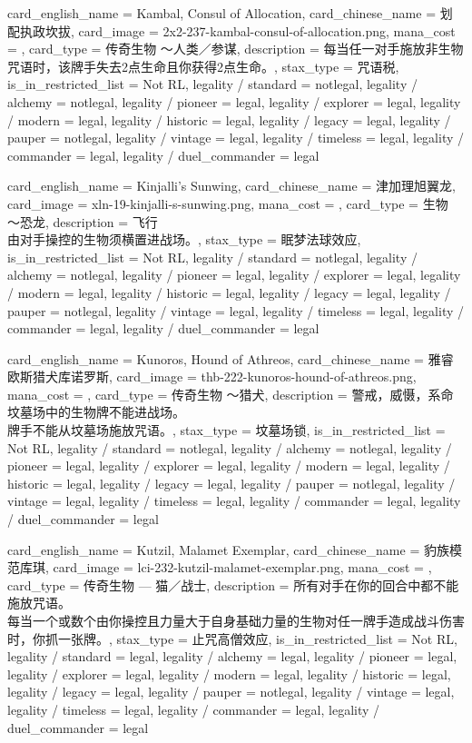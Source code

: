 \documentclass[lang = cn, color = black, 10pt]{AllThatStax}
\begin{document}
\card
{
	card_english_name = {Kambal, Consul of Allocation},
	card_chinese_name = {划配执政坎拔},
	card_image = 2x2-237-kambal-consul-of-allocation.png,
	mana_cost = ,
	card_type = 传奇生物 ～人类／参谋,
	description = {每当任一对手施放非生物咒语时，该牌手失去2点生命且你获得2点生命。},
	stax_type = 咒语税,
	is_in_restricted_list = Not RL,
	legality / standard = notlegal,
	legality / alchemy = notlegal,
	legality / pioneer = legal,
	legality / explorer = legal,
	legality / modern = legal,
	legality / historic = legal,
	legality / legacy = legal,
	legality / pauper = notlegal,
	legality / vintage = legal,
	legality / timeless = legal,
	legality / commander = legal,
	legality / duel_commander = legal
}

\card
{
	card_english_name = {Kinjalli's Sunwing},
	card_chinese_name = {津加理旭翼龙},
	card_image = xln-19-kinjalli-s-sunwing.png,
	mana_cost = ,
	card_type = 生物 ～恐龙,
	description = {飞行\\
		由对手操控的生物须横置进战场。},
	stax_type = 眠梦法球效应,
	is_in_restricted_list = Not RL,
	legality / standard = notlegal,
	legality / alchemy = notlegal,
	legality / pioneer = legal,
	legality / explorer = legal,
	legality / modern = legal,
	legality / historic = legal,
	legality / legacy = legal,
	legality / pauper = notlegal,
	legality / vintage = legal,
	legality / timeless = legal,
	legality / commander = legal,
	legality / duel_commander = legal
}

\card
{
	card_english_name = {Kunoros, Hound of Athreos},
	card_chinese_name = {雅睿欧斯猎犬库诺罗斯},
	card_image = thb-222-kunoros-hound-of-athreos.png,
	mana_cost = ,
	card_type = 传奇生物 ～猎犬,
	description = {警戒，威慑，系命\\
		坟墓场中的生物牌不能进战场。\\
		牌手不能从坟墓场施放咒语。},
	stax_type = 坟墓场锁,
	is_in_restricted_list = Not RL,
	legality / standard = notlegal,
	legality / alchemy = notlegal,
	legality / pioneer = legal,
	legality / explorer = legal,
	legality / modern = legal,
	legality / historic = legal,
	legality / legacy = legal,
	legality / pauper = notlegal,
	legality / vintage = legal,
	legality / timeless = legal,
	legality / commander = legal,
	legality / duel_commander = legal
}

\card
{
	card_english_name = {Kutzil, Malamet Exemplar},
	card_chinese_name = {豹族模范库琪},
	card_image = lci-232-kutzil-malamet-exemplar.png,
	mana_cost = ,
	card_type = 传奇生物 — 猫／战士,
	description = {所有对手在你的回合中都不能施放咒语。\\
		每当一个或数个由你操控且力量大于自身基础力量的生物对任一牌手造成战斗伤害时，你抓一张牌。},
	stax_type = 止咒高僧效应,
	is_in_restricted_list = Not RL,
	legality / standard = legal,
	legality / alchemy = legal,
	legality / pioneer = legal,
	legality / explorer = legal,
	legality / modern = legal,
	legality / historic = legal,
	legality / legacy = legal,
	legality / pauper = notlegal,
	legality / vintage = legal,
	legality / timeless = legal,
	legality / commander = legal,
	legality / duel_commander = legal
}
\end{document}

